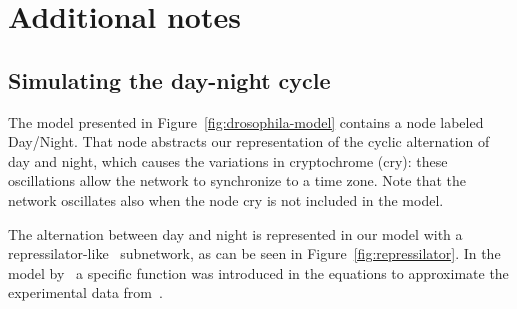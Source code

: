 \documentclass{bmcart}
\begin{document}
\clearpage
\section*{Additional notes}

\subsection*{Simulating the day-night cycle}\label{suppl:repressilator}
The model presented in Figure~\ref{fig:drosophila-model} contains a node
labeled {\sf Day/Night}. That node abstracts our representation
of the cyclic alternation of day and night, which causes the variations
in cryptochrome ({\sf cry}): these oscillations allow the network
to synchronize to a time zone. Note that the network oscillates
also when the node {\sf cry} is not included in the model.

The alternation between day and night is represented in our model with a
repressilator-like~\cite{repressilator} subnetwork, as can be seen in Figure~\ref{fig:repressilator}.
In the model by~\cite{drosophila-ode-model} a specific function
was introduced in the equations to approximate the experimental data from~\cite{drosophila-cry-data}.
\end{document}
